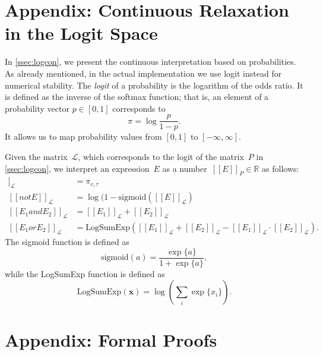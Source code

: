 \documentclass[acmsmall, review, anonymous]{acmart}\settopmatter{printfolios=true,printccs=false,printacmref=false}
\newcommand{\qqpi}[2]{[\![#2]\!]_{#1}}
\newcommand{\margincomment}[2]{\marginpar{\scriptsize\color{Maroon}#1 says: #2}}
\newcommand{\ivp}[1]{\margincomment{IVP}{#1}}
\begin{document}
\appendix
\section{Appendix: Continuous Relaxation in the Logit Space}\label{app:appendix-logit}

In \cref{ssec:logcon}, we present the continuous interpretation based on probabilities.
As already mentioned, in the actual implementation we use logit instead for numerical stability.
The \emph{logit} of a probability is the logarithm of the odds ratio.
It is defined as the inverse of the softmax function; that is, an element of a probability vector $p \in [0,1]$ corresponds to
\begin{equation*}
	\pi = \log \frac{p}{1 - p}.
\end{equation*}
It allows us to map probability values from $\left[ 0, 1 \right]$ to $\left[ -\infty, \infty \right]$.

Given the matrix~$\mathcal{L}$, which corresponds to the logit of the matrix~$P$ in \cref{ssec:logcon}, we interpret an expression~$E$ as a number~$\qqpi{P}{E} \in \mathbb{R}$ as  follows:
\begin{align*}
	\qqpi{\mathcal{L}}{x_v \mathrel{is} l_\tau} & = \pi_{v,\tau}                                                \\ \label{eq:logits}
	\qqpi{\mathcal{L}}{\mathrel{not} E}         & = \log(1-\text{sigmoid}(\qqpi{\mathcal{L}}{E})                \\
	\qqpi{\mathcal{L}}{E_1 \mathrel{and} E_2}   & = \qqpi{\mathcal{L}}{E_1} \mathrel{+} \qqpi{\mathcal{L}}{E_2} \\
	\qqpi{\mathcal{L}}{E_1 \mathrel{or} E_2}    & = \text{LogSumExp}(
	\qqpi{\mathcal{L}}{E_1} + \qqpi{\mathcal{L}}{E_2} - \qqpi{\mathcal{L}}{E_1} \cdot \qqpi{\mathcal{L}}{E_2}).
\end{align*}
The sigmoid function is defined as
\begin{equation*}
	\text{sigmoid}(a) = \frac{\exp\{a\}}{1 + \exp\{a\}},
\end{equation*}
while the LogSumExp function is defined as
\begin{equation*}
	\text{LogSumExp}(\bm{x}) = \log\left( \sum_i \exp\{x_i\} \right).
\end{equation*}

\section{Appendix: Formal Proofs}\label{app:proofs}
\end{document}
